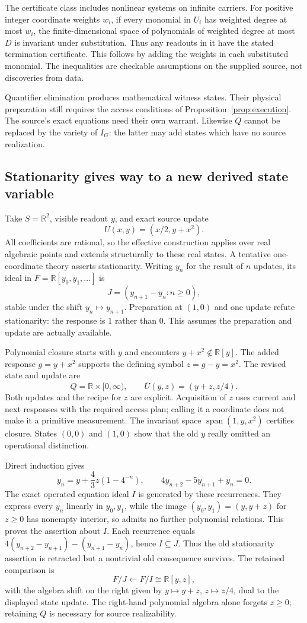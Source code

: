 \documentclass[11pt]{article}
\theoremstyle{definition}
\theoremstyle{remark}\newtheorem{remark}[theorem]{Remark}
\newcommand{\R}{\mathbb R}
\begin{document}
The certificate class includes nonlinear systems on infinite carriers.
For positive integer coordinate weights $w_i$, if every monomial in $U_i$ has
weighted degree at most $w_i$, the finite-dimensional space of polynomials
of weighted degree at most $D$ is invariant under substitution. Thus any
readouts in it have the stated termination certificate. This follows by
adding the weights in each substituted monomial. The inequalities are
checkable assumptions on the supplied source, not discoveries from data.

Quantifier elimination produces mathematical witness states. Their physical
preparation still requires the access conditions of
Proposition~\ref{prop:execution}. The source's exact equations need their
own warrant. Likewise $Q$ cannot be replaced by the variety of $I_G$:
the latter may add states which have no source realization.

\subsection{Stationarity gives way to a new derived state variable}
Take $S=\R^2$, visible readout $y$, and exact source update
\[
 U(x,y)=(x/2,y+x^2).
\]
All coefficients are rational, so the effective construction applies over
real algebraic points and extends structurally to these real states.
A tentative one-coordinate theory asserts stationarity. Writing $y_n$ for
the result of $n$ updates, its ideal in $F=\R[y_0,y_1,\ldots]$ is
\[
 J=(y_{n+1}-y_n:n\ge0),
\]
stable under the shift $y_n\mapsto y_{n+1}$. Preparation at $(1,0)$ and
one update refute stationarity: the response is $1$ rather than $0$.
This assumes the preparation and update are actually available.

Polynomial closure starts with $y$ and encounters $y+x^2\notin\R[y]$.
The added response $g=y+x^2$ supports the defining symbol
$z=g-y=x^2$. The revised state and update are
\[
 Q=\R\times[0,\infty),\qquad \bar U(y,z)=(y+z,z/4).
\]
Both updates and the recipe for $z$ are explicit. Acquisition of $z$ uses
current and next responses with the required access plan; calling it a
coordinate does not make it a primitive measurement. The invariant space
$\operatorname{span}(1,y,x^2)$ certifies closure. States $(0,0)$ and $(1,0)$
show that the old $y$ really omitted an operational distinction.

Direct induction gives
\[
 y_n=y+\frac43z(1-4^{-n}),\qquad
 4y_{n+2}-5y_{n+1}+y_n=0.
\]
The exact operated equation ideal $I$ is generated by these recurrences.
They express every $y_n$ linearly in $y_0,y_1$, while the image
$(y_0,y_1)=(y,y+z)$ for $z\ge0$ has nonempty interior, so admits no further
polynomial relations. This proves the assertion about $I$.
Each recurrence equals
$4(y_{n+2}-y_{n+1})-(y_{n+1}-y_n)$, hence $I\subseteq J$.
Thus the old stationarity assertion is retracted but a nontrivial old
consequence survives. The retained comparison is
\[
 F/J\longleftarrow F/I\cong\R[y,z],
\]
with the algebra shift on the right given by $y\mapsto y+z$,
$z\mapsto z/4$, dual to the displayed state update.
The right-hand polynomial algebra alone forgets $z\ge0$; retaining $Q$
is necessary for source realizability.
\end{document}
